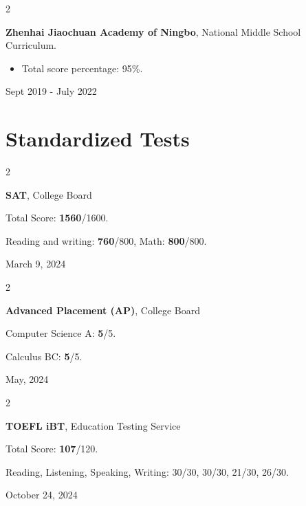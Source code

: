\documentclass[10pt, letterpaper]{article}
\newenvironment{highlights}{
    \begin{itemize}[
        topsep=0.10 cm,
        parsep=0.10 cm,
        partopsep=0pt,
        itemsep=0pt,
        leftmargin=0.4 cm + 10pt
    ]
}{
    \end{itemize}
} %
\newenvironment{twocolentry}[2][]{
    \onecolentry
    \def\secondColumn{#2}
    \setcolumnwidth{\fill, 4.5 cm}
    \begin{paracol}{2}
}{
    \switchcolumn \raggedleft \secondColumn
    \end{paracol}
    \endonecolentry
} %
\begin{document}
        \begin{twocolentry}{ Sept 2019 - July 2022 }
            \textbf{Zhenhai Jiaochuan Academy of Ningbo}, National Middle School Curriculum.
            \begin{highlights}
                \item Total score percentage: 95\%.
            \end{highlights}
        \end{twocolentry}

    \section{Standardized Tests}
    \begin{twocolentry}{March 9, 2024}
        \setlength{\parindent}{20pt}

        \noindent\textbf{SAT}, College Board

        \vspace{5pt}

        Total Score: \textbf{1560}/1600. 

        Reading and writing: \textbf{760}/800, Math: \textbf{800}/800.
        
    \end{twocolentry}

    \vspace{0.2cm}

    \begin{twocolentry}{May, 2024}
        \setlength{\parindent}{20pt}

        \textbf{Advanced Placement (AP)}, College Board

        \vspace{5pt}

        Computer Science A: \textbf{5}/5.

        Calculus BC: \textbf{5}/5.
        
    \end{twocolentry}
    
    \vspace{0.2cm}

    \begin{twocolentry}{October 24, 2024}
        \setlength{\parindent}{20pt}

        \textbf{TOEFL iBT}, Education Testing Service

        \vspace{5pt}

        Total Score: \textbf{107}/120.

        Reading, Listening, Speaking, Writing: 30/30, 30/30, 21/30, 26/30.
        
    \end{twocolentry}
\end{document}
